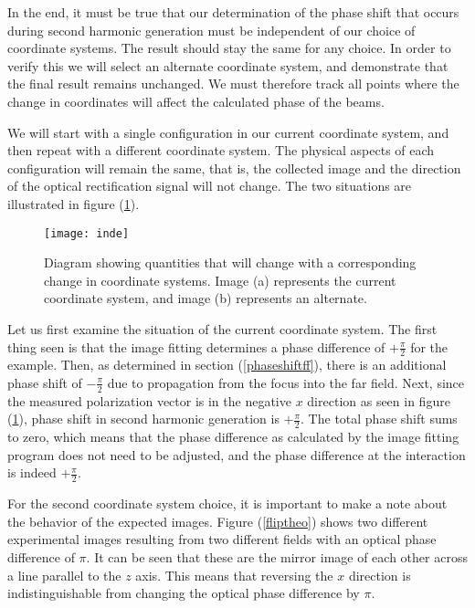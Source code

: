 In the end, it must be true that our determination of the phase
shift that occurs during second harmonic generation must be
independent of our choice of coordinate systems.  The result
should stay the same for any choice.  In order to verify this we
will select an alternate coordinate system, and demonstrate that
the final result remains unchanged.  We must therefore track all
points where the change in coordinates will affect the calculated phase of
the beams.

We will start with a single configuration in our current
coordinate system, and then repeat with a different coordinate
system. The physical aspects of each configuration will remain the
same, that is, the collected image and the direction of the
optical rectification signal will not change.  The two situations
are illustrated in figure (\ref{inde}).

\begin{figure}
\texttt{[image: inde]}
\caption[Independence of choice of coordinate system on
result]{Diagram showing quantities that will change with a
corresponding change in coordinate systems. Image (a) represents
the current coordinate system, and image (b) represents an
alternate.}
\label{inde}%
\end{figure}

Let us first examine the situation of the current coordinate
system.  The first thing seen is that the image fitting determines
a phase difference of $+\frac{\pi}{2}$ for the example.  Then, as
determined in section (\ref{phaseshiftff}), there is an additional
phase shift of $-\frac{\pi}{2}$ due to propagation from the focus
into the far field.  Next, since the measured polarization vector
is in the negative $x$ direction as seen in figure (\ref{inde}),
phase shift in second harmonic generation is $+\frac{\pi}{2}$. The
total phase shift sums to zero, which means that the phase
difference as calculated by the image fitting program does not
need to be adjusted, and the phase difference at the interaction
is indeed $+\frac{\pi}{2}$.

For the second coordinate system choice, it is important to make a
note about the behavior of the expected images.  Figure
(\ref{fliptheo}) shows two different experimental images resulting
from two different fields with an optical phase difference of
$\pi$. It can be seen that these are the mirror image of each
other across a line parallel to the $z$ axis.  This means that
reversing the $x$ direction is indistinguishable from changing the
optical phase difference by $\pi$.

